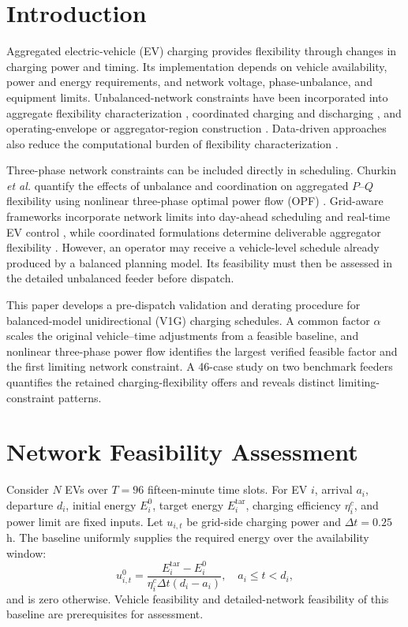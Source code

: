 \documentclass[conference,letterpaper]{IEEEtran}
\begin{document}
\section{Introduction}
Aggregated electric-vehicle (EV) charging provides flexibility through changes in charging power and timing. Its implementation depends on vehicle availability, power and energy requirements, and network voltage, phase-unbalance, and equipment limits. Unbalanced-network constraints have been incorporated into aggregate flexibility characterization \cite{chen2020}, coordinated charging and discharging \cite{nimalsiri2024}, and operating-envelope or aggregator-region construction \cite{russell2023,liu2024,russell2024,jalilian2026}. Data-driven approaches also reduce the computational burden of flexibility characterization \cite{wang2025}.

Three-phase network constraints can be included directly in scheduling. Churkin \emph{et al.} quantify the effects of unbalance and coordination on aggregated $P$--$Q$ flexibility using nonlinear three-phase optimal power flow (OPF) \cite{churkin2026}. Grid-aware frameworks incorporate network limits into day-ahead scheduling and real-time EV control \cite{gupta2025}, while coordinated formulations determine deliverable aggregator flexibility \cite{baharvandi2025}. However, an operator may receive a vehicle-level schedule already produced by a balanced planning model. Its feasibility must then be assessed in the detailed unbalanced feeder before dispatch.

This paper develops a pre-dispatch validation and derating procedure for balanced-model unidirectional (V1G) charging schedules. A common factor $\alpha$ scales the original vehicle--time adjustments from a feasible baseline, and nonlinear three-phase power flow identifies the largest verified feasible factor and the first limiting network constraint. A 46-case study on two benchmark feeders quantifies the retained charging-flexibility offers and reveals distinct limiting-constraint patterns.

\section{Network Feasibility Assessment}
\label{sec:method}
Consider $N$ EVs over $T=96$ fifteen-minute time slots. For EV $i$, arrival $a_i$, departure $d_i$, initial energy $E_i^0$, target energy $E_i^{\mathrm{tar}}$, charging efficiency $\eta_i^c$, and power limit are fixed inputs. Let $u_{i,t}$ be grid-side charging power and $\Delta t=0.25$ h. The baseline uniformly supplies the required energy over the availability window:
\begin{equation}
u^0_{i,t}=\frac{E_i^{\mathrm{tar}}-E_i^0}{\eta_i^c\Delta t(d_i-a_i)},\quad a_i\leq t<d_i,
\label{eq:baseline}
\end{equation}
and is zero otherwise. Vehicle feasibility and detailed-network feasibility of this baseline are prerequisites for assessment.
\end{document}
